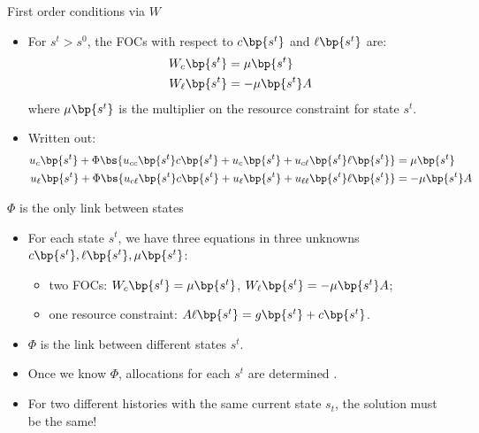 \documentclass[11pt,xcolor={dvipsnames},aspectratio=159,hyperref={pdftex,pdfpagemode=UseNone,hidelinks,pdfdisplaydoctitle=true},usepdftitle=false]{beamer}
\begin{document}
            \begin{frame}{First order conditions via $W$}
            \begin{itemize}
            \item For $s^t > s^0$, the FOCs with respect to $c\bp{s^t}$ and $\ell\bp{s^t}$ are:
            \begin{align*}
              W_c\bp{s^t} & =  \mu \bp{s^t} \\
              W_\ell\bp{s^t} & =  - \mu \bp{s^t} A
            \end{align*}
            where $\mu\bp{s^t}$ is the multiplier on the resource constraint for state $s^t$.
            \item Written out:
            \begin{align*}
              u_c\bp{s^t} + \Phi \bs{ u_{cc} \bp{s^t} c\bp{s^t} + u_c \bp{s^t} + u_{c\ell} \bp{s^t} \ell\bp{s^t} }  & =  \mu \bp{s^t} \\
              u_\ell\bp{s^t} +\Phi \bs{ u_{c\ell} \bp{s^t} c\bp{s^t} + u_\ell \bp{s^t} + u_{\ell\ell} \bp{s^t} \ell\bp{s^t} }  & =  - \mu \bp{s^t} A
            \end{align*}
            \end{itemize}
            \end{frame}
            \begin{frame}{$\Phi$ is the only link between states}
                \begin{itemize}
                \item For each state $s^t$, we have three equations in three unknowns $c\bp{s^t},\ell\bp{s^t},\mu\bp{s^t}$:
                \begin{itemize}
                    \item two FOCs: $W_c\bp{s^t} = \mu\bp{s^t}$, $W_\ell\bp{s^t} = -\mu\bp{s^t} A$;
                    \item one resource constraint: $A\ell\bp{s^t} = g\bp{s^t} + c\bp{s^t}$.
                \end{itemize}
                \item $\Phi$ is the  link between different states $s^t$.
                \item Once we know $\Phi$, allocations for each $s^t$ are determined .
                \item For two different histories with the same current state $s_t$, the solution must be the same!
            \end{itemize}
                \end{frame}
        
\end{document}
